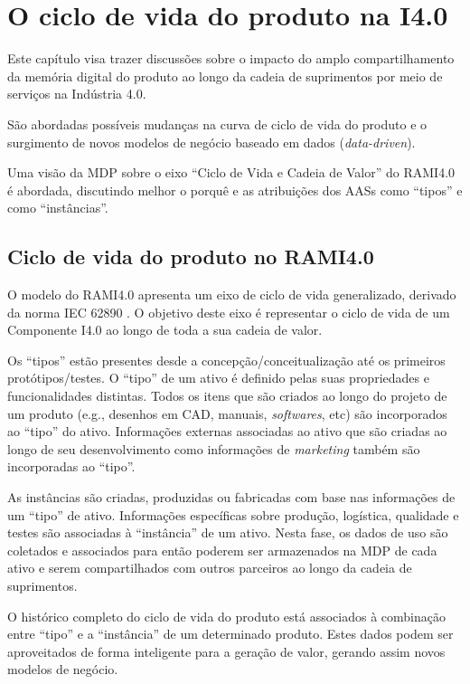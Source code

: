 \chapter{O ciclo de vida do produto na I4.0}
\label{cha:ciclo-de-vida}
	
	Este capítulo visa trazer discussões sobre o impacto do amplo compartilhamento da memória digital do produto ao longo da cadeia de suprimentos por meio de serviços na Indústria 4.0.
	
	São abordadas possíveis mudanças na curva de ciclo de vida do produto e o surgimento de novos modelos de negócio baseado em dados (\textit{data-driven}).
	
	Uma visão da MDP sobre o eixo ``Ciclo de Vida e Cadeia de Valor'' do RAMI4.0 é abordada, discutindo melhor o porquê e as atribuições dos AASs como ``tipos'' e como ``instâncias''.
	

\section{Ciclo de vida do produto no RAMI4.0}
	
	O modelo do RAMI4.0 apresenta um eixo de ciclo de vida generalizado, derivado da norma IEC 62890 \cite{adolphs2015rami}. O objetivo deste eixo é representar o ciclo de vida de um Componente I4.0 ao longo de toda a sua cadeia de valor.
	
	Os ``tipos'' estão presentes desde a concepção/conceitualização até os primeiros protótipos/testes. O ``tipo'' de um ativo é definido pelas suas propriedades e funcionalidades distintas. Todos os itens que são criados ao longo do projeto de um produto (e.g., desenhos em CAD, manuais, \textit{softwares}, etc) são incorporados ao ``tipo'' do ativo. Informações externas associadas ao ativo que são criadas ao longo de seu desenvolvimento como informações de \textit{marketing} também são incorporadas ao ``tipo''.
	
	As instâncias são criadas, produzidas ou fabricadas com base nas informações de um ``tipo'' de ativo. Informações específicas sobre produção, logística, qualidade e testes são associadas à ``instância'' de um ativo. Nesta fase, os dados de uso são coletados e associados para então poderem ser armazenados na MDP de cada ativo e serem compartilhados com outros parceiros ao longo da cadeia de suprimentos. 
	
	O histórico completo do ciclo de vida do produto está associados à combinação entre ``tipo'' e a ``instância'' de um determinado produto. Estes dados podem ser aproveitados de forma inteligente para a geração de valor, gerando assim novos modelos de negócio.
	
